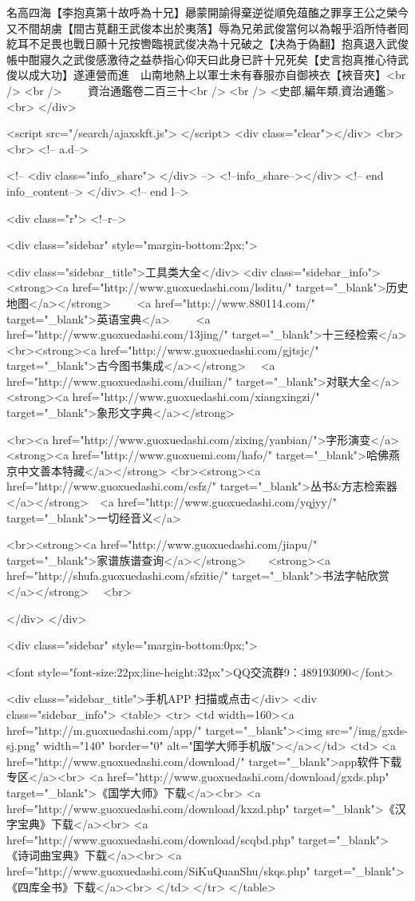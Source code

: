 名高四海【李抱真第十故呼為十兄】曏蒙開諭得棄逆從順免葅醢之罪享王公之榮今又不間胡虜【間古莧翻王武俊本出於夷落】辱為兄弟武俊當何以為報乎滔所恃者囘紇耳不足畏也戰日願十兄按轡臨視武俊决為十兄破之【决為于偽翻】抱真退入武俊帳中酣寢久之武俊感激待之益恭指心仰天曰此身已許十兄死矣【史言抱真推心待武俊以成大功】遂連營而進　山南地熱上以軍士未有春服亦自御裌衣【裌音夾】<br />
<br />
　　資治通鑑卷二百三十<br />
<br />
<史部,編年類,資治通鑑>  <br>
   </div> 

<script src="/search/ajaxskft.js"> </script>
 <div class="clear"></div>
<br>
<br>
 <!-- a.d-->

 <!--
<div class="info_share">
</div> 
-->
 <!--info_share--></div>   <!-- end info_content-->
  </div> <!-- end l-->

<div class="r">   <!--r-->



<div class="sidebar"  style="margin-bottom:2px;">

 
<div class="sidebar_title">工具类大全</div>
<div class="sidebar_info">
<strong><a href="http://www.guoxuedashi.com/lsditu/" target="_blank">历史地图</a></strong>　　
<a href="http://www.880114.com/" target="_blank">英语宝典</a>　　
<a href="http://www.guoxuedashi.com/13jing/" target="_blank">十三经检索</a>　
<br><strong><a href="http://www.guoxuedashi.com/gjtsjc/" target="_blank">古今图书集成</a></strong>　
<a href="http://www.guoxuedashi.com/duilian/" target="_blank">对联大全</a>　<strong><a href="http://www.guoxuedashi.com/xiangxingzi/" target="_blank">象形文字典</a></strong>　

<br><a href="http://www.guoxuedashi.com/zixing/yanbian/">字形演变</a>　　<strong><a href="http://www.guoxuemi.com/hafo/" target="_blank">哈佛燕京中文善本特藏</a></strong>
<br><strong><a href="http://www.guoxuedashi.com/csfz/" target="_blank">丛书&方志检索器</a></strong>　<a href="http://www.guoxuedashi.com/yqjyy/" target="_blank">一切经音义</a>　　

<br><strong><a href="http://www.guoxuedashi.com/jiapu/" target="_blank">家谱族谱查询</a></strong>　　<strong><a href="http://shufa.guoxuedashi.com/sfzitie/" target="_blank">书法字帖欣赏</a></strong>　
<br>

</div>
</div>


<div class="sidebar" style="margin-bottom:0px;">

<font style="font-size:22px;line-height:32px">QQ交流群9：489193090</font>


<div class="sidebar_title">手机APP 扫描或点击</div>
<div class="sidebar_info">
<table>
<tr>
	<td width=160><a href="http://m.guoxuedashi.com/app/" target="_blank"><img src="/img/gxds-sj.png" width="140"  border="0" alt="国学大师手机版"></a></td>
	<td>
<a href="http://www.guoxuedashi.com/download/" target="_blank">app软件下载专区</a><br>
<a href="http://www.guoxuedashi.com/download/gxds.php" target="_blank">《国学大师》下载</a><br>
<a href="http://www.guoxuedashi.com/download/kxzd.php" target="_blank">《汉字宝典》下载</a><br>
<a href="http://www.guoxuedashi.com/download/scqbd.php" target="_blank">《诗词曲宝典》下载</a><br>
<a href="http://www.guoxuedashi.com/SiKuQuanShu/skqs.php" target="_blank">《四库全书》下载</a><br>
</td>
</tr>
</table>

